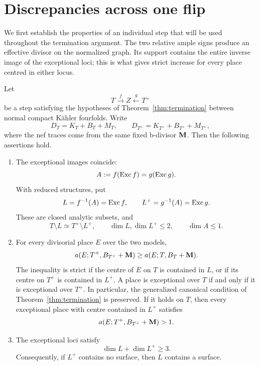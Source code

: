 \section{Discrepancies across one flip}\label{sec:comparison}

We first establish the properties of an individual step that will be
used throughout the termination argument.  The two relative ample
signs produce an effective divisor on the normalized graph.  Its
support contains the entire inverse image of the exceptional loci;
this is what gives strict increase for every place centred in either
locus.

\begin{proposition}\label{prop:comparison}
Let
\[
 T\overset{f}{\longrightarrow}Z
   \overset{g}{\longleftarrow}T^+
\]
be a step satisfying the hypotheses of Theorem~\ref{thm:termination} between normal compact K\"ahler fourfolds.  Write
\[
 D_T=K_T+B_T+M_T,\qquad
 D_{T^+}=K_{T^+}+B_{T^+}+M_{T^+},
\]
where the nef traces come from the same fixed b-divisor $\mathbf M$.
Then the following assertions hold.
\begin{enumerate}
\item The exceptional images coincide:
\[
 A:=f(\operatorname{Exc} f)=g(\operatorname{Exc} g).
\]
With reduced structures, put
\[
 L=f^{-1}(A)=\operatorname{Exc} f,\qquad
 L^+=g^{-1}(A)=\operatorname{Exc} g.
\]
These are closed analytic subsets, and
\[
 T\setminus L\simeq T^+\setminus L^+,
 \qquad \dim L,\dim L^+\leq2,\qquad \dim A\leq1.
\]
\item For every divisorial place $E$ over the two models,
\begin{equation}\label{eq:discrepancy-monotonicity}
 a(E;T^+,B_{T^+}+\mathbf M)
 \geq a(E;T,B_T+\mathbf M).
\end{equation}
The inequality is strict if the centre of $E$ on $T$ is contained in
$L$, or if its centre on $T^+$ is contained in $L^+$.
A place is exceptional over $T$ if and only if it is exceptional over
$T^+$. In particular, the generalized canonical condition of
Theorem~\ref{thm:termination} is preserved. If it holds on $T$, then
every exceptional place with centre contained in $L^+$ satisfies
\begin{equation}\label{eq:target-strict-discrepancy}
 a(E;T^+,B_{T^+}+\mathbf M)>1.
\end{equation}
\item The exceptional loci satisfy
\begin{equation}\label{eq:exceptional-dimensions}
 \dim L+\dim L^+\geq3.
\end{equation}
Consequently, if $L^+$ contains no surface, then $L$ contains a surface.
\end{enumerate}
\end{proposition}

